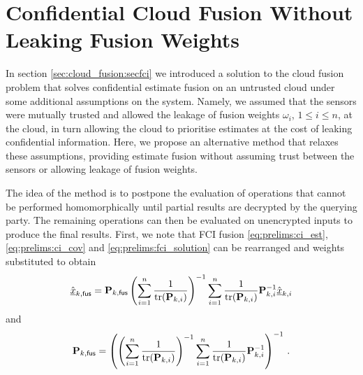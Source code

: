 % 
%                                                                                           
%                                                                                           
%                                                                                           
% 

\section{Confidential Cloud Fusion Without Leaking Fusion Weights}\label{sec:cloud_fusion:secfci2}
In section \ref{sec:cloud_fusion:secfci} we introduced a solution to the cloud fusion problem that solves confidential estimate fusion on an untrusted cloud under some additional assumptions on the system. Namely, we assumed that the sensors were mutually trusted and allowed the leakage of fusion weights $\omega_i$, $1\leq i\leq n$, at the cloud, in turn allowing the cloud to prioritise estimates at the cost of leaking confidential information. Here, we propose an alternative method that relaxes these assumptions, providing estimate fusion without assuming trust between the sensors or allowing leakage of fusion weights. 

The idea of the method is to postpone the evaluation of operations that cannot be performed homomorphically until partial results are decrypted by the querying party. The remaining operations can then be evaluated on unencrypted inputs to produce the final results. First, we note that FCI fusion \eqref{eq:prelims:ci_est}, \eqref{eq:prelims:ci_cov} and \eqref{eq:prelims:fci_solution} can be rearranged and weights substituted to obtain
\begin{equation}\label{eq:cloud_fusion:secfci2_est_rearrange}
    \hat{{\underline{x}}}_{k,\mathsf{fus}} = {{\mathbf{P}}}_{k,\mathsf{fus}}\left(\sum_{i=1}^n \frac{1}{\operatorname{tr}({{\mathbf{P}}}_{k,i})}\right)^{-1}\sum_{i=1}^n\frac{1}{\operatorname{tr}({{\mathbf{P}}}_{k,i})}{{\mathbf{P}}}_{k,i}^{-1}\hat{{\underline{x}}}_{k,i}
\end{equation}
and
\begin{equation}\label{eq:cloud_fusion:secfci2_cov_rearrange}
    {\ensuremath{{\mathbf{P}}}}_{k,\mathsf{fus}} = \left(\left(\sum_{i=1}^n \frac{1}{\operatorname{tr}({{\mathbf{P}}}_{k,i})}\right)^{-1}\sum_{i=1}^n \frac{1}{\operatorname{tr}({{\mathbf{P}}}_{k,i})}{{\mathbf{P}}}_{k,i}^{-1}\right)^{-1}\,.
\end{equation}

